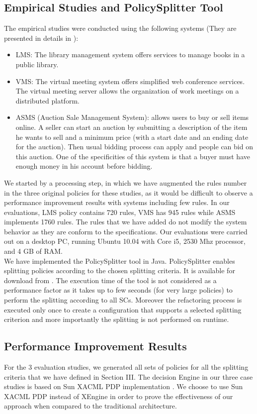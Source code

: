 \subsection{Empirical Studies and PolicySplitter Tool}
The empirical studies were conducted using the following systems (They are presented in details in \cite{testcase}):
\begin{itemize}	
\item LMS: The library management system offers services to manage books in a public library.
\item VMS: The virtual meeting system offers simplified web conference services. The virtual meeting server allows the organization of work meetings on 
a distributed platform.
\item ASMS (Auction Sale Management System): allows users to buy or sell items online. A seller can start an auction by submitting a description of the
item he wants to sell and a minimum price (with a start date and an ending date for the auction). Then usual bidding process can apply and people can bid 
on this auction. One of the specificities of this system is that a buyer must have enough money in his account before bidding.
\end{itemize}
We started by a processing step, in which we have augmented the rules number in the three original policies for these studies, as it would be difficult
 to observe a performance improvement results with systems including few rules. In our evaluations, LMS policy contains 720 rules, VMS has 945 rules while ASMS implements 1760 rules. 
The rules that we have added do not modify the system behavior as they are conform to the specifications. Our evaluations were carried out on a desktop PC, running Ubuntu 10.04 with Core i5, 2530 Mhz processor, and 4 GB of RAM. 
\\
We have implemented the PolicySplitter tool in Java. PolicySplitter enables splitting policies according to the chosen splitting criteria. 
It is available for download from \cite{splitter}.
The execution time of the tool is not considered as a performance factor as it takes up to few seconds (for very large policies) to perform the splitting 
according to all SCs. Moreover the refactoring process is executed only once to create a configuration that supports a selected splitting criterion and more importantly
the splitting is not performed on runtime.


\subsection{Performance Improvement Results}
For the 3 evaluation studies, we generated all sets of policies for all the splitting criteria that we have defined in Section III.
The decision Engine in our three case studies is based on Sun XACML PDP implementation \cite{sunxacml}. We choose to use Sun XACML PDP instead of XEngine in order to prove the effectiveness
 of our approach when compared to the traditional architecture.



